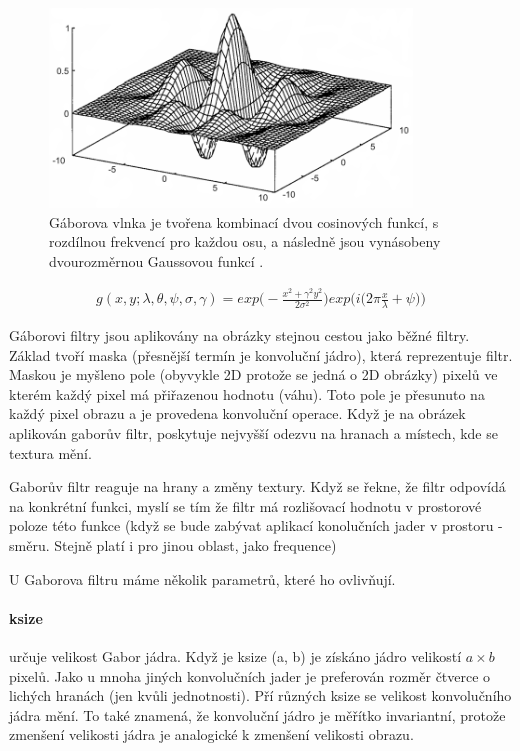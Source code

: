 \documentclass[czech,BP]{thesiskiv}
\begin{document}
\begin{figure}[H]
		\centering
		\includegraphics[height=200px]{./img/gabor.png}
		\caption{Gáborova vlnka je tvořena kombinací dvou cosinových funkcí, s rozdílnou frekvencí pro každou osu, a následně jsou vynásobeny dvourozměrnou Gaussovou funkcí \cite{Gabor}.} 					
\end{figure}

\begin{align}
   \label{gabor_complex}  g(x, y; \lambda, \theta, \psi, \sigma,  \gamma) = exp \Bigg( - \frac{{x^2 + \gamma^2 y^2}}{2 \sigma^2} \Bigg) exp \Bigg(i \bigg(2\pi \frac{x}{\lambda} + \psi \bigg)\Bigg)  
\end{align}

\par Gáborovi filtry jsou aplikovány na obrázky stejnou cestou jako běžné filtry. Základ tvoří maska (přesnější termín je konvoluční jádro), která reprezentuje filtr. Maskou je myšleno pole (obyvykle 2D protože se jedná o 2D obrázky) pixelů ve kterém každý pixel má přiřazenou hodnotu (váhu). Toto pole je přesunuto na každý pixel obrazu a je provedena konvoluční operace. Když je na obrázek aplikován gaborův filtr, poskytuje nejvyšší odezvu na hranach a místech, kde se textura mění. \cite{Gabor_wordpress}

\par Gaborův filtr reaguje na hrany a změny textury. Když se řekne, že filtr odpovídá na konkrétní funkci, myslí se tím že filtr má rozlišovací hodnotu v prostorové poloze této funkce (když se bude zabývat aplikací konolučních jader v prostoru - směru. Stejně platí i pro jinou oblast, jako frequence)

U Gaborova filtru máme několik parametrů, které ho ovlivňují. 
\paragraph{ksize} určuje velikost Gabor jádra. Když je ksize (a, b) je získáno jádro velikostí $a \times b$ pixelů. Jako u mnoha jiných konvolučních jader je preferován rozměr čtverce o lichých hranách (jen kvůli jednotnosti). Pří různých ksize se velikost konvolučního jádra mění. To také znamená, že konvoluční jádro je měřítko invariantní, protože zmenšení velikosti jádra je analogické k zmenšení velikosti obrazu. 
\end{document}
